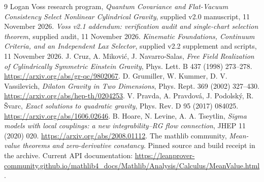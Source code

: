 \documentclass[11pt]{article}
\begin{document}
\begin{thebibliography}{9}
 Logan Voss research program, \emph{Quantum Covariance and Flat-Vacuum Consistency Select Nonlinear Cylindrical Gravity}, supplied v2.0 manuscript, 11 November 2026.
 \emph{Voss v2.1 addendum: verification audit and single-chart selection theorem}, supplied audit, 11 November 2026.
 \emph{Kinematic Foundations, Continuum Criteria, and an Independent Lax Selector}, supplied v2.2 supplement and scripts, 11 November 2026.
 J. Cruz, A. Mikovi\'c, J. Navarro-Salas, \emph{Free Field Realization of Cylindrically Symmetric Einstein Gravity}, Phys. Lett. B 437 (1998) 273--278. \url{https://arxiv.org/abs/gr-qc/9802067}.
 D. Grumiller, W. Kummer, D. V. Vassilevich, \emph{Dilaton Gravity in Two Dimensions}, Phys. Rept. 369 (2002) 327--430. \url{https://arxiv.org/abs/hep-th/0204253}.
 V. Pravda, A. Pravdov\'a, J. Podolsk\'y, R. \v Svarc, \emph{Exact solutions to quadratic gravity}, Phys. Rev. D 95 (2017) 084025. \url{https://arxiv.org/abs/1606.02646}.
 B. Hoare, N. Levine, A. A. Tseytlin, \emph{Sigma models with local couplings: a new integrability--RG flow connection}, JHEP 11 (2020) 020. \url{https://arxiv.org/abs/2008.01112}.
 The mathlib community, \emph{Mean-value theorems and zero-derivative constancy}. Pinned source and build receipt in the archive. Current API documentation: \url{https://leanprover-community.github.io/mathlib4_docs/Mathlib/Analysis/Calculus/MeanValue.html}.
\end{thebibliography}
\end{document}
